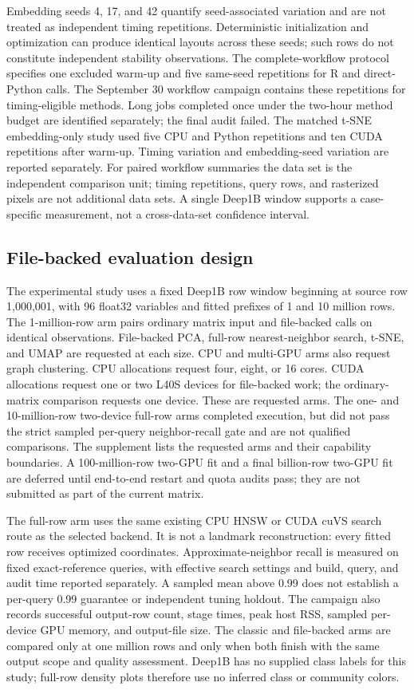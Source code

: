 \documentclass[article]{jss}
\begin{document}
Embedding seeds 4, 17, and 42 quantify seed-associated variation and are not
treated as independent timing repetitions. Deterministic initialization and
optimization can produce identical layouts across these seeds; such rows do
not constitute independent stability observations. The complete-workflow
protocol specifies one excluded warm-up and five same-seed repetitions for
R and direct-Python calls. The September 30 workflow campaign contains these
repetitions for timing-eligible methods. Long jobs completed once under
the two-hour method budget are identified separately; the final audit failed.
The matched t-SNE embedding-only study used five CPU
and Python repetitions and ten CUDA repetitions after warm-up. Timing
variation and embedding-seed variation are reported separately.
For paired workflow summaries the data set is the independent comparison
unit; timing repetitions, query rows, and rasterized pixels are not
additional data sets. A single Deep1B window supports a case-specific
measurement, not a cross-data-set confidence interval.

\subsection{File-backed evaluation design}

The experimental study uses a fixed Deep1B row window beginning at source
row 1,000,001, with 96 float32 variables and fitted prefixes of 1 and
10 million rows. The 1-million-row arm pairs ordinary matrix
input and file-backed calls on identical observations. File-backed PCA,
full-row nearest-neighbor search, t-SNE, and UMAP are requested at each
size. CPU and multi-GPU arms also request graph clustering. CPU
allocations request four, eight, or 16 cores.
CUDA allocations request one or two L40S devices for file-backed
work; the ordinary-matrix comparison requests one device. These are
requested arms. The one- and 10-million-row two-device full-row arms
completed execution, but did not pass the strict sampled per-query
neighbor-recall gate and are not qualified comparisons.
The supplement lists the requested arms and their capability boundaries.
A 100-million-row two-GPU fit and a final billion-row two-GPU fit are
deferred until end-to-end restart and quota audits pass; they are not
submitted as part of the current matrix.

The full-row arm uses the same existing CPU HNSW or CUDA cuVS search route
as the selected backend. It is not a landmark reconstruction: every fitted
row receives optimized coordinates. Approximate-neighbor recall is measured
on fixed exact-reference queries, with effective search settings and
build, query, and audit time reported separately. A sampled mean above
0.99 does not establish a per-query 0.99 guarantee or independent tuning
holdout. The campaign also records successful output-row count, stage
times, peak host RSS, sampled per-device GPU memory, and output-file size.
The classic and file-backed arms are compared only at one million rows and
only when both finish with the same output scope and quality assessment.
Deep1B has no supplied class labels for this study; full-row density plots
therefore use no inferred class or community colors.
\end{document}
